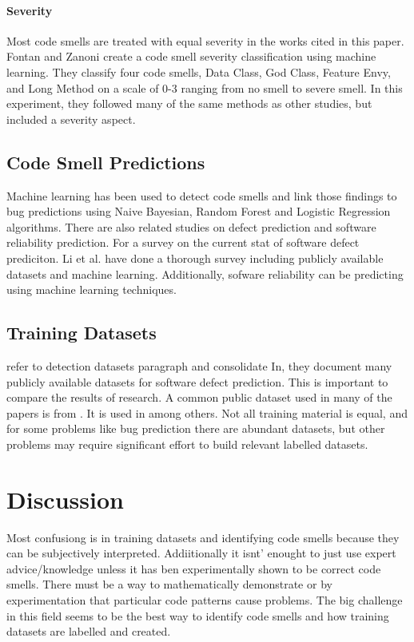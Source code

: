 \documentclass[conference]{IEEEtran}
\begin{document}
\paragraph{Severity} Most code smells are treated with equal severity in the works cited in this paper. Fontan and Zanoni\cite{fontana_code_2017} create a code smell severity classification using machine learning. They classify four code smells, Data Class, God Class, Feature Envy, and Long Method on a scale of 0-3 ranging from no smell to severe smell. In this experiment, they followed many of the same methods as other studies, but included a severity aspect.


\subsection{Code Smell Predictions}
Machine learning has been used to detect code smells and link those findings to bug predictions\cite{ubayawardana_bug_2018} using Naive Bayesian, Random Forest and Logistic Regression algorithms.
There are also related studies on defect prediction and software reliability prediction.
For a survey on the current stat of software defect prediciton\cite{li_progress_2018}. Li et al. have done a thorough survey including publicly available datasets and machine learning.
Additionally, sofware reliability can be predicting using machine learning techniques\cite{kulamala_predicting_2018}.

\subsection{Training Datasets}
refer to detection datasets paragraph and consolidate
In\cite{li_progress_2018}, they document many publicly available datasets for software defect prediction. This is important to compare the results of research.
A common public dataset used in many of the papers is from \cite{fontana_code_2017}. It is used in \cite{karaduzovic-hadziabdic_comparison_2018} among others.
Not all training material is equal\cite{fakhoury_keep_2018}, and for some problems like bug prediction there are abundant datasets, but other problems may require significant effort to build relevant labelled datasets.

\section{Discussion}
Most confusiong is in training datasets and identifying code smells because they can be subjectively interpreted.
Addiitionally it isnt' enought to just use expert advice/knowledge unless it has ben experimentally shown to be correct code smells. 
There must be a way to mathematically demonstrate or by experimentation that particular code patterns cause problems.
The big challenge in this field seems to be the best way to identify code smells and how training datasets are labelled and created.
\end{document}
